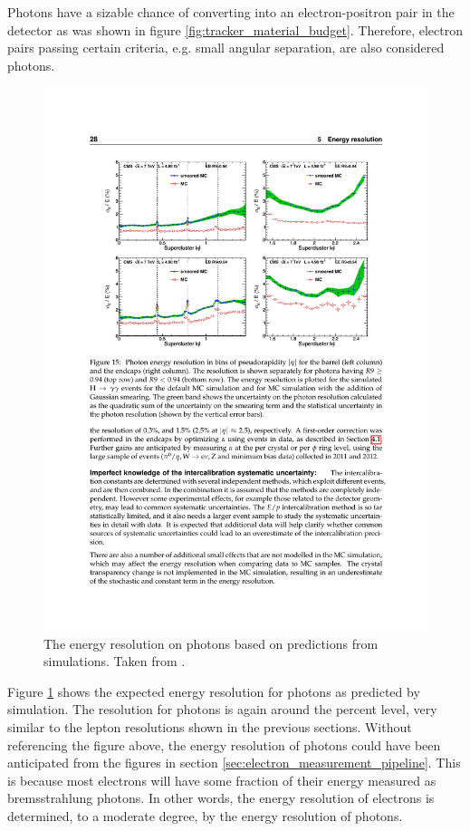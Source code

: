     Photons have a sizable chance of converting into an electron-positron pair in the detector as was shown in figure \ref{fig:tracker_material_budget}. Therefore, electron pairs passing certain criteria, e.g. small angular separation, are also considered photons. 

    \begin{figure}[h!]
      \centering
        \includegraphics[width=.7\textwidth]{figures/photon_E_resolution.pdf}
        \caption{The energy resolution on photons based on predictions from simulations. Taken from \cite{ecal_energy_reco}.}
        \label{fig:photon_E_resolution}
    \end{figure}

    Figure \ref{fig:photon_E_resolution} shows the expected energy resolution for photons as predicted by simulation. The resolution for photons is again around the percent level, very similar to the lepton resolutions shown in the previous sections. Without referencing the figure above, the energy resolution of photons could have been anticipated from the figures in section \ref{sec:electron_measurement_pipeline}. This is because most electrons will have some fraction of their energy measured as bremsstrahlung photons. In other words, the energy resolution of electrons is determined, to a moderate degree, by the energy resolution of photons.

